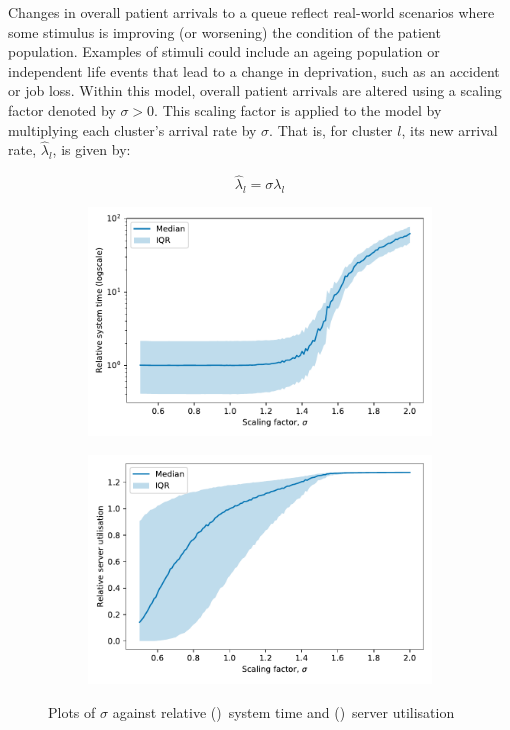 Changes in overall patient arrivals to a queue reflect real-world scenarios
where some stimulus is improving (or worsening) the condition of the patient
population. Examples of stimuli could include an ageing population or
independent life events that lead to a change in deprivation, such as an
accident or job loss. Within this model, overall patient arrivals are altered
using a scaling factor denoted by \(\sigma > 0\). This scaling factor is applied
to the model by multiplying each cluster's arrival rate by \(\sigma\). That is,
for cluster \(l\), its new arrival rate, \(\hat\lambda_l\),
is given by:

\begin{equation}\label{eq:lambda}
    \hat\lambda_{l} = \sigma\lambda_l
\end{equation}

\begin{figure}
    \centering
    \begin{subfigure}{\imgwidth}
        \includegraphics[width=\linewidth]{lambda_time}
        \caption{}\label{fig:lambda_time}
    \end{subfigure}

    \begin{subfigure}{\imgwidth}
        \includegraphics[width=\linewidth]{lambda_util}
        \caption{}\label{fig:lambda_util}
    \end{subfigure}
    \caption{%
        Plots of \(\sigma\) against relative ()~system
        time and ()~server utilisation
    }\label{fig:lambda}
\end{figure}

